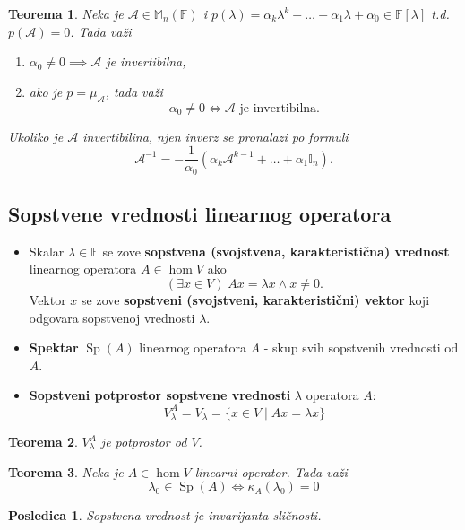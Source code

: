 \documentclass[a4paper,12pt,twoside]{report}
\newtheorem{theorem}{Teorema}[section]
\newtheorem{corollary}{Posledica}[theorem]
\numberwithin{algorithm}{section}
\begin{document}
\begin{theorem}
    Neka je $\mathcal{A} \in \mathbb{M}_n(\mathbb{F})$ i $p(\lambda) = \alpha_k\lambda^k + \dots + \alpha_1\lambda + \alpha_0
     \in \mathbb{F}[\lambda]$ t.d. $p(\mathcal{A})=0$. Tada važi
    \begin{enumerate}
        \item $\alpha_0 \neq 0 \implies \mathcal{A}$ je invertibilna,
        \item ako je $p = \mu_\mathcal{A}$, tada važi
        \[  \alpha_0 \neq 0 \iff \mathcal{A} \text{ je invertibilna.}\]
    \end{enumerate}
    Ukoliko je $\mathcal{A}$ invertibilina, njen inverz se pronalazi po formuli
    \[ \mathcal{A}^{-1} = - \frac{1}{\alpha_0}\left( \alpha_k\mathcal{A}^{k-1}+\dots + \alpha_1\mathbb{I}_n \right). \]
\end{theorem}

\subsection{Sopstvene vrednosti linearnog operatora}

\begin{itemize}
    \item Skalar $\lambda \in \mathbb{F}$ se zove \textbf{sopstvena (svojstvena, karakteristična) vrednost} linearnog operatora $A \in \hom V$ ako
    \[ (\exists x \in V)\; Ax = \lambda x \land x \neq 0. \] Vektor $x$ se zove \textbf{sopstveni (svojstveni, karakteristični) vektor} koji odgovara 
    sopstvenoj vrednosti $\lambda$.
    \item \textbf{Spektar} $\operatorname{Sp}(A)$ linearnog operatora $A$ - skup svih sopstvenih vrednosti od $A$.
    \item \textbf{Sopstveni potprostor sopstvene vrednosti} $\lambda$ operatora $A$:
    \[ V_\lambda^A = V_\lambda = \{x \in V \;|\; Ax = \lambda x\} \]
\end{itemize}

\begin{theorem}
    $V_\lambda^A$ je potprostor od $V$.
\end{theorem}

\begin{theorem}
    Neka je $A \in \hom V$ linearni operator. Tada važi
    \[ \lambda_0 \in \operatorname{Sp}(A) \iff \kappa_A(\lambda_0) = 0 \]
\end{theorem}

\begin{corollary}
    Sopstvena vrednost je invarijanta sličnosti.
\end{corollary}
\end{document}
